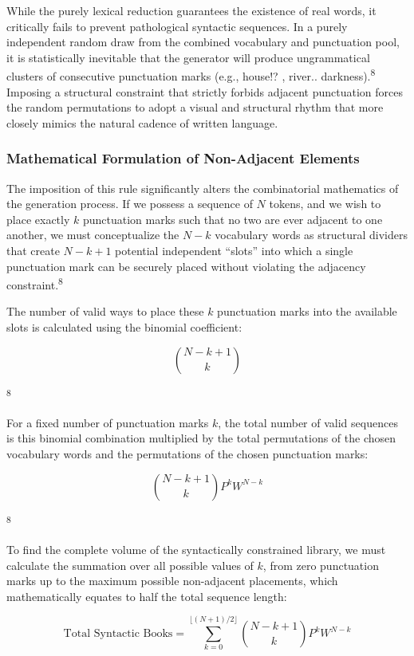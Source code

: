 \documentclass[
  11pt,
  a4paper,
]{article}
\begin{document}
While the purely lexical reduction guarantees the existence of real words, it critically fails to prevent pathological syntactic sequences. In a purely independent random draw from the combined vocabulary and punctuation pool, it is statistically inevitable that the generator will produce ungrammatical clusters of consecutive punctuation marks (e.g., house!? , river.. darkness).\textsuperscript{8} Imposing a structural constraint that strictly forbids adjacent punctuation forces the random permutations to adopt a visual and structural rhythm that more closely mimics the natural cadence of written language.

\subsubsection{Mathematical Formulation of Non-Adjacent Elements}\label{mathematical-formulation-of-non-adjacent-elements}

The imposition of this rule significantly alters the combinatorial mathematics of the generation process. If we possess a sequence of \(N\) tokens, and we wish to place exactly \(k\) punctuation marks such that no two are ever adjacent to one another, we must conceptualize the \(N-k\) vocabulary words as structural dividers that create \(N-k+1\) potential independent ``slots'' into which a single punctuation mark can be securely placed without violating the adjacency constraint.\textsuperscript{8}

The number of valid ways to place these \(k\) punctuation marks into the available slots is calculated using the binomial coefficient:

\[
\binom{N-k+1}{k}
\]

\textsuperscript{8}

For a fixed number of punctuation marks \(k\), the total number of valid sequences is this binomial combination multiplied by the total permutations of the chosen vocabulary words and the permutations of the chosen punctuation marks:

\[
\binom{N-k+1}{k}P^kW^{N-k}
\]

\textsuperscript{8}

To find the complete volume of the syntactically constrained library, we must calculate the summation over all possible values of \(k\), from zero punctuation marks up to the maximum possible non-adjacent placements, which mathematically equates to half the total sequence length:

\[
\text{Total Syntactic Books}=\sum_{k=0}^{\lfloor (N+1)/2 \rfloor}\binom{N-k+1}{k}P^kW^{N-k}
\]
\end{document}
